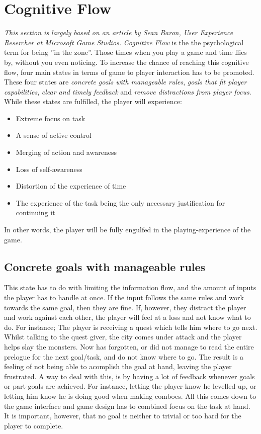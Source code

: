 \section{Cognitive Flow}\label{gamedesign:cognitiveflow}
\emph{This section is largely based on an article by Sean Baron, User Experience Resercher at Microsoft Game Studios\cite{baron}.}
\emph{Cognitive Flow} is the the psychological term for being ''in the zone''. Those times when you play a game and time flies by, without you even noticing. 
To increase the chance of reaching this cognitive flow, four main states in terms of game to player interaction has to be promoted. 
These four states are \emph{concrete goals with manageable rules}, \emph{goals that fit player capabilities}, \emph{clear and timely feedback} and \emph{remove distractions from player focus}. While these states are fulfilled, the player will experience:
\begin{itemize}
\item Extreme focus on task
\item A sense of active control
\item Merging of action and awareness
\item Loss of self-awareness
\item Distortion of the experience of time
\item The experience of the task being the only necessary justification for continuing it
\end{itemize}

In other words, the player will be fully engulfed in the playing-experience of the game.

\subsection{Concrete goals with manageable rules}
This state has to do with limiting the information flow, and the amount of inputs the player has to handle at once. If the input follows the same rules and work towards the same goal, then they are fine. If, however, they distract the player and work against each other, the player will feel at a loss and not know what to do. For instance; The player is receiving a quest which tells him where to go next. Whilst talking to the quest giver, the city comes under attack and the player helps slay the monsters. Now has forgotten, or did not manage to read the entire prelogue for the next goal/task, and do not know where to go. The result is a feeling of not being able to acomplish the goal at hand, leaving the player frustrated.
A way to deal with this, is by having a lot of feedback whenever goals or part-goals are achieved. For instance, letting the player know he levelled up, or letting him know he is doing good when making comboes. All this comes down to the game interface and game design has to combined focus on the task at hand. It is important, however, that no goal is neither to trivial or too hard for the player to complete.

